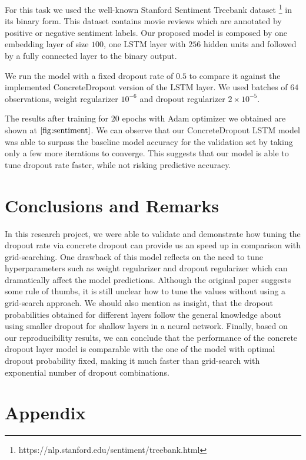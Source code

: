 \documentclass{article}
\begin{document}
For this task we used the well-known Stanford Sentiment Treebank dataset  \cite{socher2013}\footnote{https://nlp.stanford.edu/sentiment/treebank.html} in its binary form. This dataset contains movie reviews which are annotated by positive or negative sentiment labels. Our proposed model is composed by one embedding layer of size $100$, one  LSTM layer with $256$ hidden units and followed by a fully connected layer to the binary output. 

We run the model with a fixed dropout rate of $0.5$ to compare it against the implemented ConcreteDropout version of the LSTM layer. We used batches of $64$ observations, weight regularizer $10^{-6}$ and dropout regularizer $2\times 10^{-5}$. 

The results after training for $20$ epochs with Adam optimizer we obtained are shown at $\ref{fig:sentiment}$. We can observe that our ConcreteDropout LSTM model was able to surpass the baseline model accuracy for the validation set by taking only a few more iterations to converge. This suggests that our model is able to tune dropout rate faster, while not risking predictive accuracy.  

\section{Conclusions and Remarks}
 
 In this research project, we were able to validate and demonstrate how tuning the dropout rate via concrete dropout can provide us an speed up in comparison with grid-searching. One drawback of this model reflects on the need to tune hyperparameters such as weight regularizer and dropout regularizer which can dramatically affect the model predictions. Although the original paper suggests some rule of thumbs, it is still unclear how to tune the values without using a grid-search approach. We should also mention as insight, that the dropout probabilities obtained for different layers follow the general knowledge about using smaller dropout for shallow layers in a neural network. Finally, based on our reproducibility results, we can conclude that the performance of the concrete dropout layer model is comparable with the one of the model with optimal dropout probability fixed, making it much faster than grid-search with exponential number of dropout combinations. 





\newpage
\section{Appendix}
\end{document}

